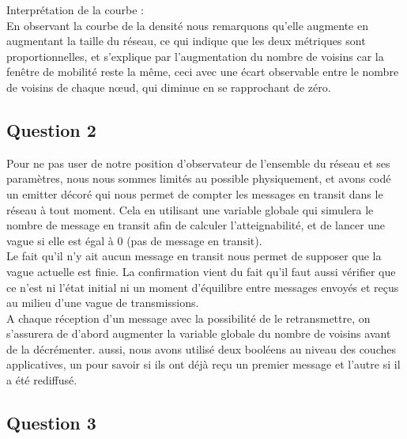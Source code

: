 \documentclass[10pt]{report}
\begin{document}
Interprétation de la courbe :\\

En observant la courbe de la densité nous remarquons qu'elle augmente en augmentant la taille du réseau, ce qui indique que les deux métriques sont proportionnelles, et s'explique par l'augmentation du nombre de voisins car la fenêtre de mobilité reste la même, ceci avec une écart observable entre le nombre de voisins de chaque nœud, qui diminue en se rapprochant de zéro.

\subsection{Question 2}

Pour ne pas user de notre position d'observateur de l'ensemble du réseau et ses paramètres, nous nous sommes limités au possible physiquement, et avons codé un emitter décoré qui nous permet de compter les messages en transit dans le réseau à tout moment. Cela en utilisant une variable globale qui simulera le nombre de message en transit afin de calculer l’atteignabilité, et de lancer une vague si elle est égal à 0 (pas de message en transit).\\
Le fait qu'il n'y ait aucun message en transit nous permet de supposer que la vague actuelle est finie. La confirmation vient du fait qu'il faut aussi vérifier que ce n'est ni l'état initial ni un moment d'équilibre entre messages envoyés et reçus au milieu d'une vague de transmissions.\\
A chaque réception d'un message avec la possibilité de le retransmettre, on s’assurera de d’abord augmenter la variable globale du nombre de voisins avant de la décrémenter. aussi, nous avons utilisé deux booléens au niveau des couches applicatives, un pour savoir si ils ont déjà reçu un premier message et l’autre si il a été rediffusé.\\

\newpage
\subsection{Question 3}
\end{document}
